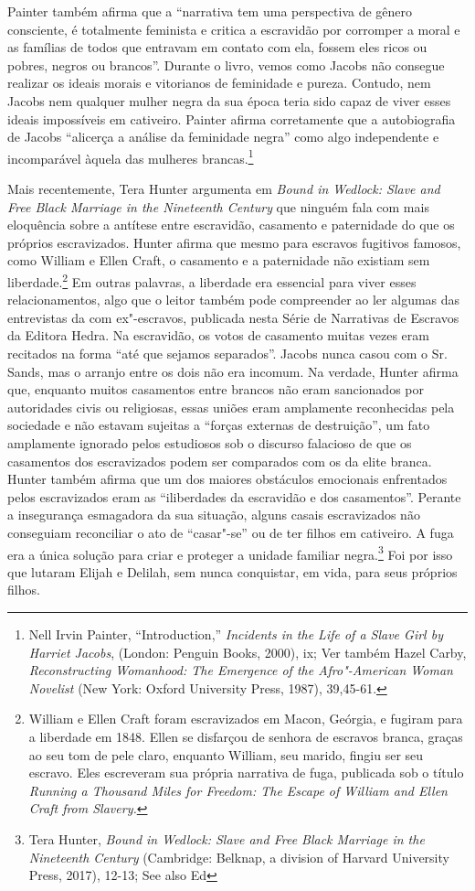 Painter também afirma que a ``narrativa tem uma perspectiva de gênero
consciente, é totalmente feminista e critica a escravidão por corromper
a moral e as famílias de todos que entravam em contato com ela, fossem
eles ricos ou pobres, negros ou brancos''. Durante o livro, vemos como
Jacobs não consegue realizar os ideais morais e vitorianos de feminidade
e pureza. Contudo, nem Jacobs nem qualquer mulher negra da sua época
teria sido capaz de viver esses ideais impossíveis em cativeiro. Painter
afirma corretamente que a autobiografia de Jacobs ``alicerça a análise
da feminidade negra'' como algo independente e incomparável àquela das
mulheres brancas.\footnote{Nell Irvin Painter, ``Introduction,''
  \emph{Incidents in the Life of a Slave Girl by Harriet Jacobs},
  (London: Penguin Books, 2000), ix; Ver também Hazel Carby,
  \emph{Reconstructing Womanhood: The Emergence of the Afro"-American
  Woman Novelist} (New York: Oxford University Press, 1987), 39,45-61.}

Mais recentemente, Tera Hunter argumenta em \emph{Bound in Wedlock:
Slave and Free Black Marriage in the Nineteenth Century} que ninguém
fala com mais eloquência sobre a antítese entre escravidão, casamento e
paternidade do que os próprios escravizados. Hunter afirma que mesmo
para escravos fugitivos famosos, como William e Ellen Craft, o casamento
e a paternidade não existiam sem liberdade.\footnote{
  William e Ellen Craft foram escravizados em Macon, Geórgia, e fugiram
  para a liberdade em 1848. Ellen se disfarçou de senhora de escravos
  branca, graças ao seu tom de pele claro, enquanto William, seu marido,
  fingiu ser seu escravo. Eles escreveram sua própria narrativa de fuga,
  publicada sob o título \emph{Running a Thousand Miles for Freedom: The
  Escape of William and Ellen Craft from Slavery.}} Em outras palavras,
a liberdade era essencial para viver esses relacionamentos, algo que o
leitor também pode compreender ao ler algumas das entrevistas da  com
ex"-escravos, publicada nesta Série de Narrativas de Escravos da Editora
Hedra. Na escravidão, os votos de casamento muitas vezes eram recitados
na forma ``até que sejamos separados''. Jacobs nunca casou com o Sr.
Sands, mas o arranjo entre os dois não era incomum. Na verdade, Hunter
afirma que, enquanto muitos casamentos entre brancos não eram
sancionados por autoridades civis ou religiosas, essas uniões eram
amplamente reconhecidas pela sociedade e não estavam sujeitas a ``forças
externas de destruição'', um fato amplamente ignorado pelos estudiosos
sob o discurso falacioso de que os casamentos dos escravizados podem
ser comparados com os da elite branca. Hunter também
afirma que um dos maiores obstáculos emocionais enfrentados pelos
escravizados eram as ``iliberdades da escravidão e dos casamentos''.
Perante a insegurança esmagadora da sua situação, alguns casais
escravizados não conseguiam reconciliar o ato de ``casar"-se'' ou de ter
filhos em cativeiro. A fuga era a única solução para criar e proteger a
unidade familiar negra.\footnote{Tera Hunter, \emph{Bound in Wedlock:
  Slave and Free Black Marriage in the Nineteenth Century} (Cambridge:
  Belknap, a division of Harvard University Press, 2017), 12-13; See
  also Ed} Foi por isso que lutaram Elijah e Delilah, sem nunca
conquistar, em vida, para seus próprios filhos.

